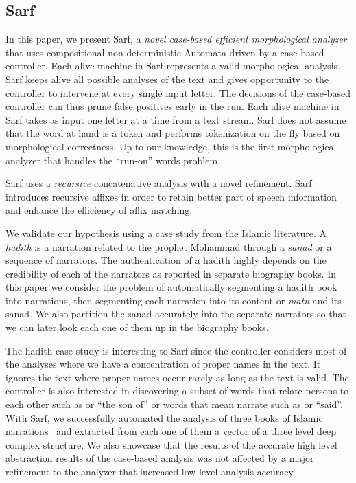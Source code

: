 \documentclass[11pt,letterpaper]{article}
\begin{document}
\subsection{Sarf}
\label{sec:intro:sarf}

In this paper, we present Sarf, a {\em novel case-based efficient
morphological analyzer} that uses compositional 
non-deterministic Automata driven by a case based controller.
Each alive machine in Sarf represents a valid morphological analysis. 
Sarf keeps alive all possible analyses of the text and gives 
opportunity to the controller to intervene at every single input 
letter. 
The decisions of the case-based controller can thus prune false 
positives early in the run. 
Each alive machine in Sarf takes as input one letter at a time 
from a text stream. 
Sarf does not assume that the word at hand is a token and
performs tokenization on the fly based on morphological correctness.
Up to our knowledge, this is the first morphological analyzer that 
handles the ``run-on'' words problem. 

Sarf uses a {\em recursive} concatenative analysis with a novel 
refinement. 
Sarf introduces recursive affixes in order to
retain better part of speech information and enhance the 
efficiency of affix matching. 


\transfalse
\begin{figure}[tb]
\end{figure}
\transtrue

We validate our hypothesis using a case study from the Islamic 
literature. 
A {\em hadith} is a narration related to the prophet Mohammad
through a {\em sanad} or a sequence of narrators. 
The authentication of a hadith highly depends on the credibility
of each of the narrators as reported in separate biography 
books. 
In this paper we consider the problem of automatically segmenting
a hadith book into narrations, then segmenting each narration into
its content or {\em matn} and its sanad.
We also partition the sanad accurately into the 
separate narrators so that we can later look each one of them 
up in the biography books. 

The hadith case study is interesting to Sarf since the controller
considers most of the analyses where we have a concentration
of proper names in the text. It ignores the text where
proper names occur rarely as long 
as the text is valid.
The controller is also interested in discovering a subset of words 
that relate persons to each other such as  or ``the son of''
or words that mean narrate such as  or ``said''. 
With Sarf, we successfully automated the analysis of 
three books of Islamic narrations~\cite{IbnHanbal,AlTousi,AlKulayni}
and extracted from each one of them a vector of a three level deep
complex structure. 
We also showcase that the results of the accurate high level abstraction
results of the case-based analysis was not affected by a major
refinement to the analyzer that increased low level analysis accuracy. 
\end{document}

